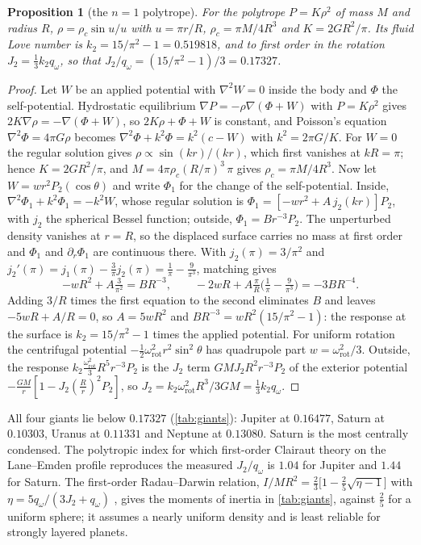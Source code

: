 \documentclass[11pt]{article}
\newtheorem{proposition}[theorem]{Proposition}
\theoremstyle{definition}\newtheorem{definition}[theorem]{Definition}
\theoremstyle{remark}\newtheorem{remark}[theorem]{Remark}
\begin{document}
\begin{proposition}[the $n=1$ polytrope]\label{prop:love}
For the polytrope $P=K\rho^2$ of mass $M$ and radius $R$, $\rho=\rho_c\sin u/u$ with $u=\pi r/R$, $\rho_c=\pi M/4R^3$ and $K=2GR^2/\pi$. Its fluid Love number is $k_2=15/\pi^2-1=0.519818$, and to first order in the rotation $J_2=\frac13k_2q_\omega$, so that $J_2/q_\omega=(15/\pi^2-1)/3=0.17327$.
\end{proposition}
\begin{proof}
Let $W$ be an applied potential with $\nabla^2W=0$ inside the body and $\Phi$ the self-potential. Hydrostatic equilibrium $\nabla P=-\rho\nabla(\Phi+W)$ with $P=K\rho^2$ gives $2K\nabla\rho=-\nabla(\Phi+W)$, so $2K\rho+\Phi+W$ is constant, and Poisson's equation $\nabla^2\Phi=4\pi G\rho$ becomes $\nabla^2\Phi+k^2\Phi=k^2(c-W)$ with $k^2=2\pi G/K$. For $W=0$ the regular solution gives $\rho\propto\sin(kr)/(kr)$, which first vanishes at $kR=\pi$; hence $K=2GR^2/\pi$, and $M=4\pi\rho_c(R/\pi)^3\,\pi$ gives $\rho_c=\pi M/4R^3$. Now let $W=wr^2P_2(\cos\theta)$ and write $\Phi_1$ for the change of the self-potential. Inside, $\nabla^2\Phi_1+k^2\Phi_1=-k^2W$, whose regular solution is $\Phi_1=[-wr^2+A\,j_2(kr)]P_2$, with $j_2$ the spherical Bessel function; outside, $\Phi_1=Br^{-3}P_2$. The unperturbed density vanishes at $r=R$, so the displaced surface carries no mass at first order and $\Phi_1$ and $\partial_r\Phi_1$ are continuous there. With $j_2(\pi)=3/\pi^2$ and $j_2'(\pi)=j_1(\pi)-\frac3\pi j_2(\pi)=\frac1\pi-\frac9{\pi^3}$, matching gives
\[
-wR^2+A\tfrac3{\pi^2}=BR^{-3},\qquad -2wR+A\tfrac\pi R\bigl(\tfrac1\pi-\tfrac9{\pi^3}\bigr)=-3BR^{-4}.
\]
Adding $3/R$ times the first equation to the second eliminates $B$ and leaves $-5wR+A/R=0$, so $A=5wR^2$ and $BR^{-3}=wR^2(15/\pi^2-1)$: the response at the surface is $k_2=15/\pi^2-1$ times the applied potential. For uniform rotation the centrifugal potential $-\frac12\omega_\mathrm{rot}^2r^2\sin^2\theta$ has quadrupole part $w=\omega_\mathrm{rot}^2/3$. Outside, the response $k_2\frac{\omega_\mathrm{rot}^2}3R^5r^{-3}P_2$ is the $J_2$ term $GMJ_2R^2r^{-3}P_2$ of the exterior potential $-\frac{GM}r[1-J_2(\frac Rr)^2P_2]$, so $J_2=k_2\omega_\mathrm{rot}^2R^3/3GM=\frac13k_2q_\omega$.
\end{proof}

All four giants lie below $0.17327$ (\cref{tab:giants}): Jupiter at $0.16477$, Saturn at $0.10303$, Uranus at $0.11331$ and Neptune at $0.13080$. Saturn is the most centrally condensed. The polytropic index for which first-order Clairaut theory on the Lane--Emden profile reproduces the measured $J_2/q_\omega$ is $1.04$ for Jupiter and $1.44$ for Saturn. The first-order Radau--Darwin relation, $I/MR^2=\frac23\bigl[1-\frac25\sqrt{\eta-1}\bigr]$ with $\eta=5q_\omega/(3J_2+q_\omega)$ \cite{MilitzerHubbard2023}, gives the moments of inertia in \cref{tab:giants}, against $\frac25$ for a uniform sphere; it assumes a nearly uniform density and is least reliable for strongly layered planets.
\end{document}
